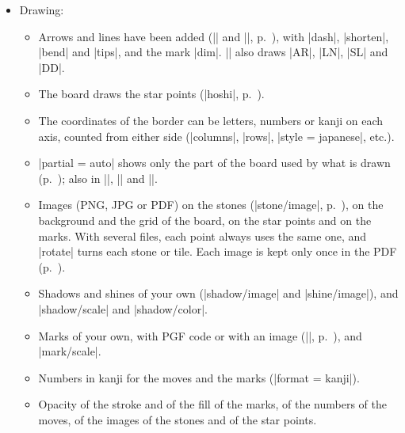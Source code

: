 \begin{itemize}
\begin{itemize}
\begin{itemize}
					\item |last mark| marks the last move, and |to = last| goes to the end.
					\item |\sgfproblem| has been added, which draws a problem (tsumego): the statement and one diagram for each variation of the solution, with its comments (p.~\pageref{subsec:sgfproblemas}). With |game = 1:20|, a problem sheet from a collection; with |verdict|, the caption says whether the variation is right.
					\item With the |animate| package, |\sgfanimation| steps through a game with buttons (p.~\pageref{subsec:sgfanimacion}). It builds the animation in layers (|layers|): each stone is drawn only once, and the PDF of a long game takes much less space.
				\end{itemize}
			\item Drawing:
				\begin{itemize}
					\item Arrows and lines have been added (|\arrow| and |\line|, p.~\pageref{subsec:flechas}), with |dash|, |shorten|, |bend| and |tips|, and the mark |dim|. |\sgf| also draws |AR|, |LN|, |SL| and |DD|.
					\item The board draws the star points (|hoshi|, p.~\pageref{subsec:hoshi}).
					\item The coordinates of the border can be letters, numbers or kanji on each axis, counted from either side (|columns|, |rows|, |style = japanese|, etc.).
					\item |partial = auto| shows only the part of the board used by what is drawn (p.~\pageref{subsec:parcial}); also in |\sgfdiagrams|, |\sgfanimation| and |\sgfproblem|.
					\item Images (PNG, JPG or PDF) on the stones (|stone/image|, p.~\pageref{subsec:piedrasimagen}), on the background and the grid of the board, on the star points and on the marks. With several files, each point always uses the same one, and |rotate| turns each stone or tile. Each image is kept only once in the PDF (p.~\pageref{subsubsec:imagenespdf}).
					\item Shadows and shines of your own (|shadow/image| and |shine/image|), and |shadow/scale| and |shadow/color|.
					\item Marks of your own, with PGF code or with an image (|\pgfgodefinemark|, p.~\pageref{subsec:marcaspropias}), and |mark/scale|.
					\item Numbers in kanji for the moves and the marks (|format = kanji|).
					\item Opacity of the stroke and of the fill of the marks, of the numbers of the moves, of the images of the stones and of the star points.

\end{itemize}
\end{itemize}
\end{itemize}
